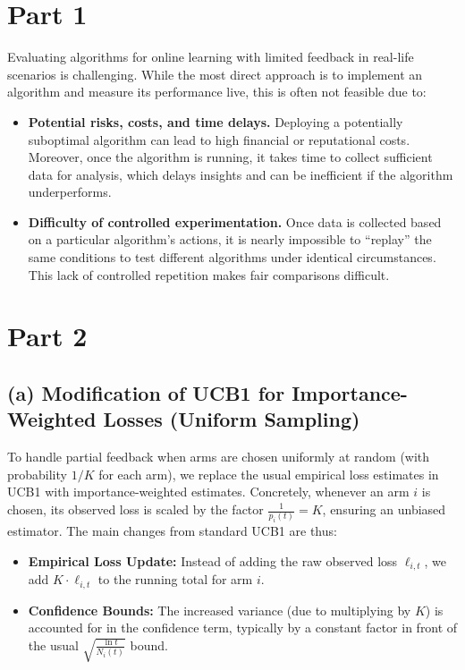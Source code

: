 \section{Part 1}

Evaluating algorithms for online learning with limited feedback in real-life scenarios is challenging. 
While the most direct approach is to implement an algorithm and measure its performance live, this is often not feasible due to:
\begin{itemize}
    \item \textbf{Potential risks, costs, and time delays.} Deploying a potentially suboptimal algorithm can lead to high financial or reputational costs. Moreover, once the algorithm is running, it takes time to collect sufficient data for analysis, which delays insights and can be inefficient if the algorithm underperforms.
    \item \textbf{Difficulty of controlled experimentation.} Once data is collected based on a particular algorithm's actions, it is nearly impossible to ``replay'' the same conditions to test different algorithms under identical circumstances. This lack of controlled repetition makes fair comparisons difficult.
\end{itemize}

\section{Part 2}

\subsection*{(a) Modification of UCB1 for Importance-Weighted Losses (Uniform Sampling)}

To handle partial feedback when arms are chosen uniformly at random (with probability \(1/K\) for each arm), we replace the usual empirical loss estimates in UCB1 with importance-weighted estimates. Concretely, whenever an arm \(i\) is chosen, its observed loss is scaled by the factor \(\frac{1}{p_i(t)} = K\), ensuring an unbiased estimator. The main changes from standard UCB1 are thus:
\begin{itemize}
    \item \textbf{Empirical Loss Update:} Instead of adding the raw observed loss \(\ell_{i,t}\), we add \(K\cdot \ell_{i,t}\) to the running total for arm \(i\). 
    \item \textbf{Confidence Bounds:} The increased variance (due to multiplying by \(K\)) is accounted for in the confidence term, typically by a constant factor in front of the usual \(\sqrt{\frac{\ln t}{N_i(t)}}\) bound.
\end{itemize}

